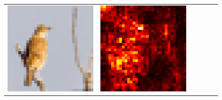 \documentclass[preprint,12pt]{elsarticle}
\begin{document}
\begin{figure}[ht]
\begin{tabular}{cccccc}
  \includegraphics[scale=\scale]{../visualizations/examples/cifar10/cnn/images/2.png} &
  \includegraphics[scale=\scale]{../visualizations/examples/cifar10/cnn/saliency_map/2.png} & 

\end{tabular}
\end{figure}
\end{document}
